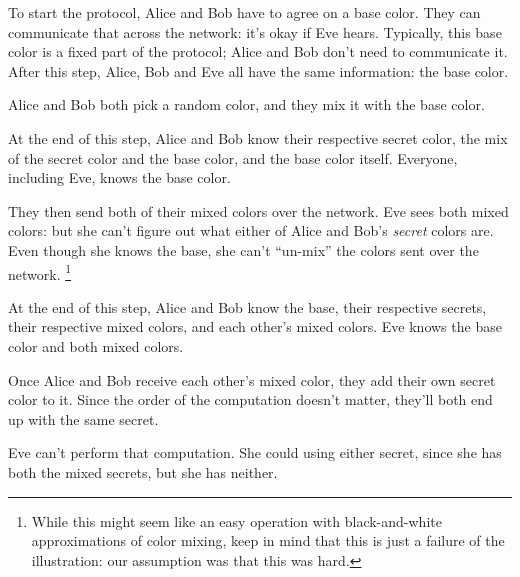 \documentclass[11pt,ebook,table,dvipsnames]{memoir}
\begin{document}
To start the protocol, Alice and Bob have to agree on a base color.
They can communicate that across the network: it's okay if Eve hears.
Typically, this base color is a fixed part of the protocol; Alice and
Bob don't need to communicate it. After this step, Alice, Bob and Eve
all have the same information: the base color.


Alice and Bob both pick a random color, and they mix it with the base
color.


At the end of this step, Alice and Bob know their respective secret
color, the mix of the secret color and the base color, and the base
color itself. Everyone, including Eve, knows the base color.


They then send both of their mixed colors over the network. Eve sees
both mixed colors: but she can't figure out what either of Alice and
Bob's \emph{secret} colors are. Even though she knows the base, she can't
\enquote{un-mix} the colors sent over the network. \footnote{While this might seem
like an easy operation with black-and-white approximations of color
mixing, keep in mind that this is just a failure of the illustration:
our assumption was that this was hard.}


At the end of this step, Alice and Bob know the base, their respective
secrets, their respective mixed colors, and each other's mixed colors.
Eve knows the base color and both mixed colors.


Once Alice and Bob receive each other's mixed color, they add their
own secret color to it. Since the order of the computation doesn't
matter, they'll both end up with the same secret.


Eve can't perform that computation. She could using either secret,
since she has both the mixed secrets, but she has neither.
\end{document}
